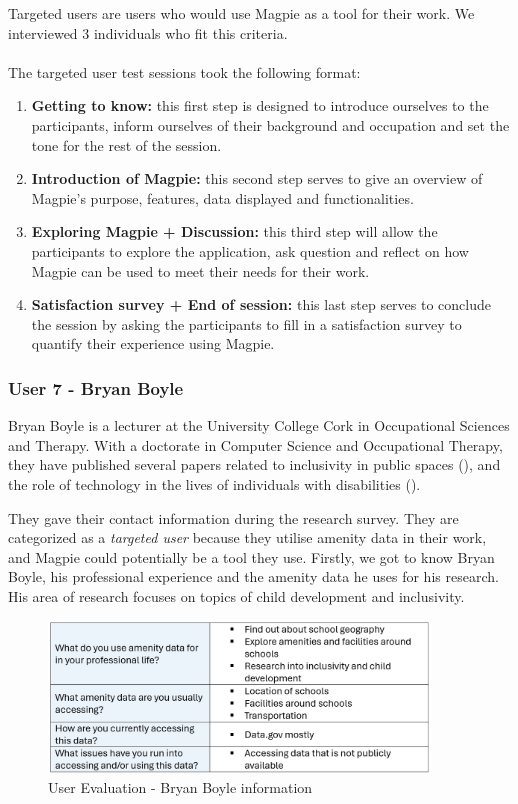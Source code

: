 Targeted users are users who would use Magpie as a tool for their work. We interviewed 3 individuals who fit this criteria.\\ \\
The targeted user test sessions took the following format:
\begin{enumerate}
    \item \textbf{Getting to know:} this first step is designed to introduce ourselves to the participants, inform ourselves of their background and occupation and set the tone for the rest of the session.
    \item \textbf{Introduction of Magpie:} this second step serves to give an overview of Magpie's purpose, features, data displayed and functionalities.
    \item \textbf{Exploring Magpie + Discussion:} this third step will allow the participants to explore the application, ask question and reflect on how Magpie can be used to meet their needs for their work.
    \item \textbf{Satisfaction survey + End of session:} this last step serves to conclude the session by asking the participants to fill in a satisfaction survey to quantify their experience using Magpie.
\end{enumerate}

\subsubsection{User 7 - Bryan Boyle}
Bryan Boyle is a lecturer at the University College Cork in Occupational
Sciences and Therapy. With a doctorate in Computer Science and Occupational
Therapy, they have published several papers related to inclusivity in public
spaces (\cite{bryanboyleplaygroundinclusion2023}), and the role of technology in
the lives of individuals with disabilities
(\cite{bryanboylechildrenautism2022}).

They gave their contact information during the research survey. They are
categorized as a \emph{targeted user} because they utilise amenity data in their
work, and Magpie could potentially be a tool they use. Firstly, we got to know
Bryan Boyle, his professional experience and the amenity data he uses for his
research. His area of research focuses on topics of child development and
inclusivity.
\begin{figure}[h!]
    \centering
    \includegraphics[width=0.9\textwidth]{images/bryan-amenity-info.png}
    \caption{User Evaluation - Bryan Boyle information}
\end{figure}

